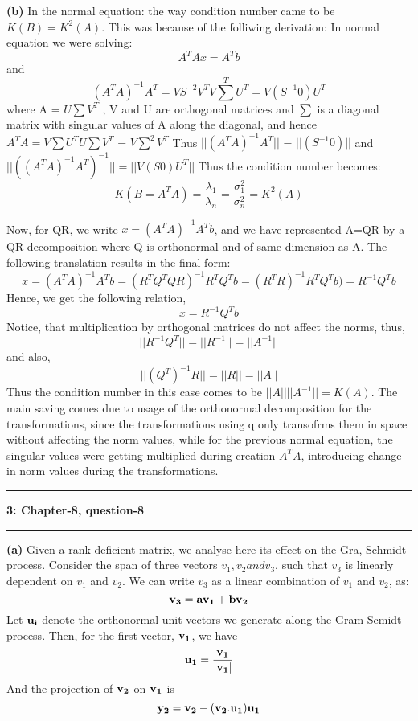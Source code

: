 \documentclass{article}
\newcommand\question[2]{\vspace{.25in}\hrule\textbf{#1: #2}\hrule\vspace{.10in}}
\renewcommand\part[1]{\vspace{.10in}\textbf{(#1)}}
\begin{document}
\part{b} In the normal equation: the way condition number came to be $K(B) = K^2(A)$. This was because of the folliwing derivation: \newline
In normal equation we were solving: 
\[A^TAx = A^Tb\] and
\[ (A^TA)^{-1}A^T = VS^{-2}V^T V\sum^{T}U^T = V(S^{-1} 0)U^T\]
where A = $U\sum V^T$ , V and U are orthogonal matrices and $\sum$ is a diagonal matrix with singular values of A along the diagonal, and hence $A^TA = V\sum U^T U\sum V^T$ = $V \sum^2 V^T$ \newline
Thus $||(A^TA)^{-1}A^T||$ = $||(S^{-1} 0)||$ and $||((A^TA)^{-1}A^T)^{-1}|| = ||V(S 0)U^T||$\newline
Thus the condition number becomes: \newline
 \[K(B=A^TA) = \dfrac{\lambda_1}{\lambda_n} = \dfrac{\sigma_{1}^2}{\sigma_{n}^2} = K^2(A)\]

Now, for QR, we write $x = (A^TA)^{-1}A^T b $, and we have represented A=QR by a QR decomposition where Q is orthonormal and of same dimension as A. The following translation results in the final form: \newline
	\[x = (A^TA)^{-1}A^T b = (R^TQ^TQR)^{-1}R^TQ^Tb = (R^TR)^{-1}R^TQ^Tb) = R^{-1}Q^Tb\]
	Hence, we get the following relation,
	\[ x = R^{-1}Q^Tb\]
	Notice, that multiplication by orthogonal matrices do not affect the norms, thus,
	\[||R^{-1}Q^T|| = ||R^{-1}|| = ||A^{-1}||\]
	and also, 
	\[||(Q^T)^{-1}R|| = ||R|| = ||A||\]
	Thus the condition number in this case comes to be $||A||||A^{-1}|| = K(A)$. \newline
	The main saving comes due to usage of the orthonormal decomposition for the transformations, since the transformations using q only transofrms them in space without affecting the norm values, while for the previous normal equation, the singular values were getting multiplied during creation $A^TA$, introducing change in norm values during the transformations. \newline

\question{3}{Chapter-8, question-8}
 \part{a} Given a rank deficient matrix, we analyse here its effect on the Gra,-Schmidt process. Consider the span of three vectors $v_1, v_2 and v_3$, such that $v_3$ is linearly dependent on $v_1$ and $v_2$. We can write $v_3$ as a linear combination of $v_1$ and $v_2$, as: \newline
 \[\bf v_3 = a\bf v_1 + b\bf v_2\]
 Let $\bf u_i$ denote the orthonormal unit vectors we generate along the Gram-Scmidt process. Then, for the first vector, $\bf v_1$, we have 
 \[\bf u_1 = \dfrac{\bf v_1}{|\bf v_1|}\]
 And the projection of $\bf v_2$ on $\bf v_1$ is
 \[ \bf y_2 = \bf v_2 - (\bf v_2.\bf u_1)\bf u_1\]
\end{document}
